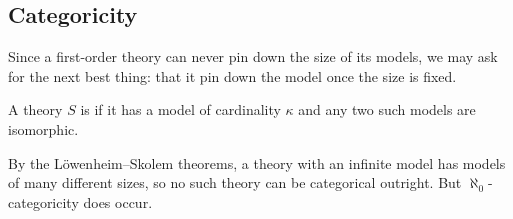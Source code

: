 \documentclass[a4paper]{scrartcl}
\begin{document}
\subsection{Categoricity}

Since a first-order theory can never pin down the size of its models, we may ask for the next best thing: that it pin down the model once the size is fixed.

\begin{definition}[Categoricity]
  A theory $S$ is  if it has a model of cardinality $\kappa$ and any two such models are isomorphic.
\end{definition}

By the L\"owenheim--Skolem theorems, a theory with an infinite model has models of many different sizes, so no such theory can be categorical outright. But $\aleph_0$-categoricity does occur.
\end{document}
